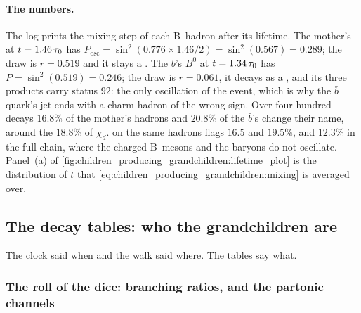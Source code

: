 \paragraph{The numbers.} The log prints the mixing step of each B~hadron
after its lifetime. The mother's \Bbar at $t=1.46\,\tau_0$ has
$P_{\mathrm{osc}}=\sin^2(0.776\times1.46/2)=\sin^2(0.567)=0.289$; the draw
is $r=0.519$ and it stays a \Bbar. The $\bar b$'s $B^0$ at $t=1.34\,\tau_0$
has $P=\sin^2(0.519)=0.246$; the draw is $r=0.061$, it decays as a \Bbar,
and its three products carry status $92$: the only oscillation of the
event, which is why the $\bar b$ quark's jet ends with a charm hadron of
the wrong sign. Over four hundred decays $16.8\%$ of the mother's hadrons
and $20.8\%$ of the $\bar b$'s change their name, around the $18.8\%$ of
$\chi_d$. \PYTHIA on the same hadrons flags $16.5$ and $19.5\%$, and
$12.3\%$ in the full chain, where the charged B~mesons and the baryons
do not oscillate. Panel~(a) of
\cref{fig:children_producing_grandchildren:lifetime_plot} is the
distribution of $t$ that \cref{eq:children_producing_grandchildren:mixing}
is averaged over.

\subsection{The decay tables: who the grandchildren are}
\label{sec:children_producing_grandchildren:decay_tables}

The clock said when and the walk said where. The tables say what.

\subsubsection{The roll of the dice: branching ratios, \texorpdfstring{}{onMode} and the partonic channels}
\label{sec:children_producing_grandchildren:tables}

